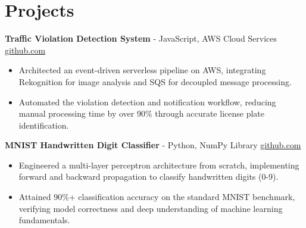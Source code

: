 \documentclass[11pt]{article}       %
\begin{document}

\vspace{-18.5pt}

\section*{Projects}

\textbf{Traffic Violation Detection System}{ - JavaScript, AWS Cloud Services} \hfill \href{https://github.com/Monica20030707/AWS_rekonigition-N-read-database}{github.com} \\
\vspace{-9pt}
\begin{itemize}
  \item Architected an event-driven serverless pipeline on AWS, integrating Rekognition for image analysis and SQS for decoupled message processing.
  \item Automated the violation detection and notification workflow, reducing manual processing time by over 90\% through accurate license plate identification.
\end{itemize}

\textbf{MNIST Handwritten Digit Classifier}{ - Python, NumPy Library} \hfill \href{https://github.com/Monica20030707/Artificial-Neutral-Network_ML}{github.com} \\
\vspace{-9pt}
\begin{itemize} 
  \item Engineered a multi-layer perceptron architecture from scratch, implementing forward and backward propagation to classify handwritten digits (0-9). 
  \item Attained 90\%+ classification accuracy on the standard MNIST benchmark, verifying model correctness and deep understanding of machine learning fundamentals.
\end{itemize}
\end{document}
